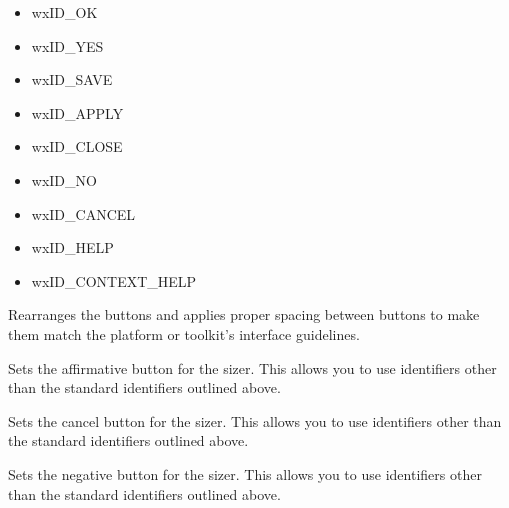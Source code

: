 \begin{itemize}\itemsep=0pt
\item wxID\_OK
\item wxID\_YES
\item wxID\_SAVE
\item wxID\_APPLY
\item wxID\_CLOSE
\item wxID\_NO
\item wxID\_CANCEL
\item wxID\_HELP
\item wxID\_CONTEXT\_HELP
\end{itemize}

\label{wxstddialogbuttonsizerrealize}


Rearranges the buttons and applies proper spacing between buttons to make them match the platform or toolkit's interface guidelines.

\label{wxstddialogbuttonsizersetaffirmativebutton}


Sets the affirmative button for the sizer. This allows you to use identifiers other than the standard identifiers outlined above.

\label{wxstddialogbuttonsizersetcancelbutton}


Sets the cancel button for the sizer. This allows you to use identifiers other than the standard identifiers outlined above.

\label{wxstddialogbuttonsizersetnegativebutton}


Sets the negative button for the sizer. This allows you to use identifiers other than the standard identifiers outlined above.

